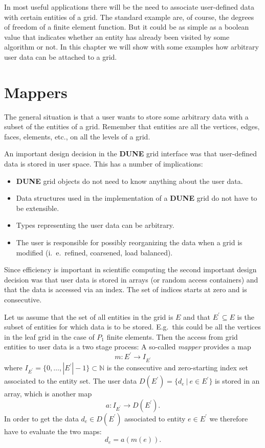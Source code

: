 \documentclass[11pt,a4paper,headinclude,footinclude,DIV16,normalheadings]{scrreprt}
\newcommand{\Dune}{{\sf\bfseries DUNE}\xspace}
\begin{document}
In most useful applications there will be the need to associate
user-defined data with certain entities of a grid. The standard
example are, of course, the degrees of freedom of a finite element
function. But it could be as simple as a boolean value that indicates
whether an entity has already been visited by some algorithm or
not. In this chapter we will show with some examples how arbitrary
user data can be attached to a grid.

\section{Mappers}\label{ch:mappers}

The general situation is that a user wants to store some arbitrary
data with a subset of the entities of a grid. Remember that entities
are all the vertices, edges, faces, elements, etc., on all the levels
of a grid.

An important design decision in the \Dune{} grid interface was that
user-defined data is stored in user space. This has a number of
implications:
\begin{itemize}
\item \Dune{} grid objects do not need to know anything about the user
  data.
\item Data structures used in the implementation of a \Dune{} grid do
  not have to be extensible.
\item Types representing the user data can be arbitrary.
\item The user is responsible for possibly reorganizing the data when
  a grid is modified (i.~e.~refined, coarsened, load balanced).
\end{itemize}

Since efficiency is important in scientific computing the second
important design decision was that user data is stored in arrays (or
random access containers) and that the data is accessed via an
index. The set of indices starts at zero and is consecutive. 

Let us assume that the set of all entities in the grid is $E$ and
that $E^\prime\subseteq E$ is the subset of entities for which data is
to be stored. E.g.~this could be all the vertices in the leaf grid in
the case of $P_1$ finite elements. Then the access from grid entities
to user data is a two stage process: A so-called \textit{mapper}
provides a map
\begin{equation}
m : E^\prime \to I_{E^\prime}
\end{equation}
where $I_{E^\prime}=\{0,\ldots,|E^\prime|-1\}\subset\mathbb{N}$ is the consecutive and
zero-starting index set associated to the entity set. The user data
$D(E^\prime)=\{d_e\ |\ e\in E^\prime\}$ is stored in an array, which
is another map
\begin{equation}
a : I_{E^\prime} \to D(E^\prime).
\end{equation}
In order to get the data $d_e\in D(E^\prime)$ associated to entity
$e\in E^\prime$ we therefore have to evaluate the two maps:
\begin{equation}
d_e = a(m(e)) .
\end{equation}
\end{document}
